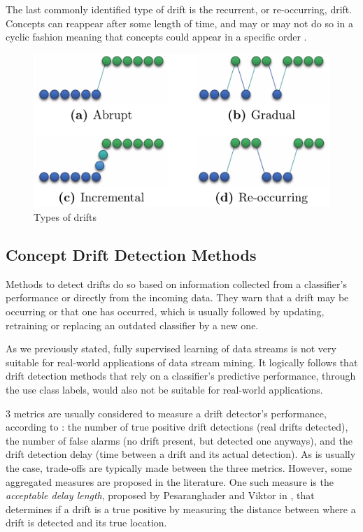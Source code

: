 The last commonly identified type of drift is the recurrent, or re-occurring, drift. Concepts can reappear after some length of time, and may or may not do so in a cyclic fashion meaning that concepts could appear in a specific order \cite{tsymbal2004problem, KRAWCZYK2017132, bifet2018machine}.


\begin{figure}
  \includegraphics[width=\linewidth]{./images/chapter2/concept-drifts}
\caption{\label{fig:concept-drift-types}Types of drifts \cite{pesaranghader2018reservoirthesis}}
\end{figure}

\subsection{Concept Drift Detection Methods}
Methods to detect drifts do so based on information collected from a classifier's performance or directly from the incoming data. They warn that a drift may be occurring or that one has occurred, which is usually followed by updating, retraining or replacing an outdated classifier by a new one.

As we previously stated, fully supervised learning of data streams is not very suitable for real-world applications of data stream mining. It logically follows that drift detection methods that rely on a classifier's predictive performance, through the use class labels, would also not be suitable for real-world applications.

3 metrics are usually considered to measure a drift detector's performance, according to \cite{KRAWCZYK2017132}: the number of true positive drift detections (real drifts detected), the number of false alarms (no drift present, but detected one anyways), and the drift detection delay (time between a drift and its actual detection).
As is usually the case, trade-offs are typically made between the three metrics. However, some aggregated measures are proposed in the literature. One such measure is the \textit{acceptable delay length}, proposed by Pesaranghader and Viktor in \cite{pesaranghader2016fast}, that determines if a drift is a true positive by measuring the distance between where a drift is detected and its true location.

